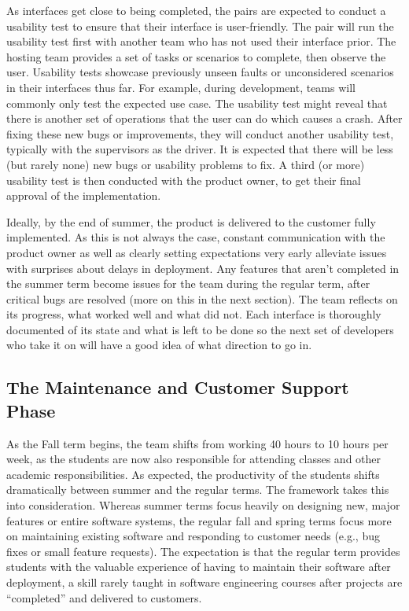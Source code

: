 As interfaces get close to being completed, the pairs are expected to conduct a usability test \cite{usabilitytesting} to ensure that their interface is user-friendly. The pair will run the usability test first with another team who has not used their interface prior. The hosting team provides a set of tasks or scenarios to complete, then observe the user. Usability tests showcase previously unseen faults or unconsidered scenarios in their interfaces thus far. For example, during development, teams will commonly only test the expected use case. The usability test might reveal that there is another set of operations that the user can do which causes a crash. After fixing these new bugs or improvements, they will conduct another usability test, typically with the supervisors as the driver. It is expected that there will be less (but rarely none) new bugs or usability problems to fix. A third (or more) usability test is then conducted with the product owner, to get their final approval of the implementation.

Ideally, by the end of summer, the product is delivered to the customer fully implemented. As this is not always the case, constant communication with the product owner as well as clearly setting expectations very early alleviate issues with surprises about delays in deployment. Any features that aren't completed in the summer term become issues for the team during the regular term, after critical bugs are resolved (more on this in the next section). The team reflects on its progress, what worked well and what did not. Each interface is thoroughly documented of its state and what is left to be done so the next set of developers who take it on will have a good idea of what direction to go in.

\subsection{The Maintenance and Customer Support Phase}
As the Fall term begins, the team shifts from working 40 hours to 10 hours per week, as the students are now also responsible for attending classes and other academic responsibilities. As expected, the productivity of the students shifts dramatically between summer and the regular terms. The framework takes this into consideration. Whereas summer terms focus heavily on designing new, major features or entire software systems, the regular fall and spring terms focus more on maintaining existing software and responding to customer needs (e.g., bug fixes or small feature requests). The expectation is that the regular term provides students with the valuable experience of having to maintain their software after deployment, a skill rarely taught in software engineering courses after projects are ``completed'' and delivered to customers.

